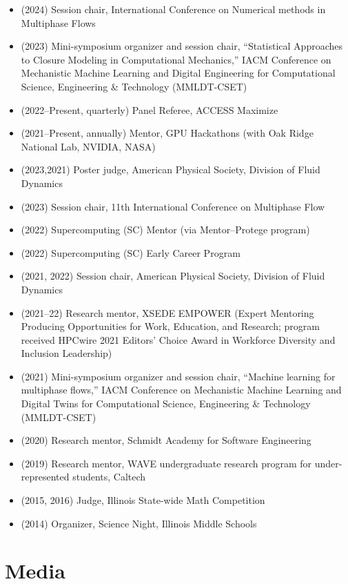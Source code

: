 \begin{itemize}
    \item (2024) Session chair, International Conference on Numerical methods in Multiphase Flows
    \item (2023) Mini-symposium organizer and session chair, ``Statistical Approaches to Closure Modeling in Computational Mechanics,'' IACM Conference on Mechanistic Machine Learning and Digital Engineering for Computational Science, Engineering \& Technology (MMLDT-CSET)
    \item (2022--Present, quarterly) Panel Referee, ACCESS Maximize
    \item (2021--Present, annually) Mentor, GPU Hackathons (with Oak Ridge National Lab, NVIDIA, NASA)
    \item (2023,2021) Poster judge, American Physical Society, Division of Fluid Dynamics
    \item (2023) Session chair, 11th International Conference on Multiphase Flow
    \item (2022) Supercomputing (SC) Mentor (via Mentor--Protege program)
    \item (2022) Supercomputing (SC) Early Career Program
    \item (2021, 2022) Session chair, American Physical Society, Division of Fluid Dynamics
    \item (2021--22) Research mentor, XSEDE EMPOWER (Expert Mentoring Producing Opportunities for Work, Education, and Research; program received HPCwire 2021 Editors' Choice Award in Workforce Diversity and Inclusion Leadership)
    \item (2021) Mini-symposium organizer and session chair, ``Machine learning for multiphase flows,'' IACM Conference on Mechanistic Machine Learning and Digital Twins for Computational Science, Engineering \& Technology (MMLDT-CSET)
    \item (2020) Research mentor, Schmidt Academy for Software Engineering
    \item (2019) Research mentor, WAVE undergraduate research program for under-represented students, Caltech
    \item (2015, 2016) Judge, Illinois State-wide Math Competition
    \item (2014) Organizer, Science Night, Illinois Middle Schools
\end{itemize}

\section{Media}


